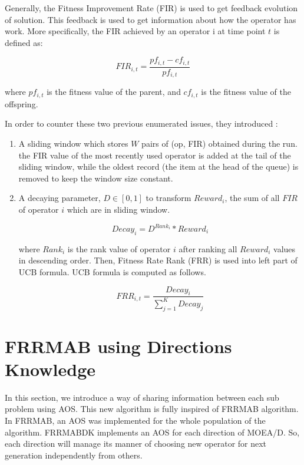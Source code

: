 \documentclass{article}
\begin{document}
    Generally, the Fitness Improvement Rate (FIR) is used to get feedback evolution of solution. This feedback is used to get information about how the operator has work. More specifically, the FIR achieved by an operator i at time point $t$ is defined as:

    \begin{equation} \label{eq:FIR} \tag{FIR}
    FIR_{i,t} = \frac{pf_{i,t} - cf_{i,t}}{pf_{i,t}}
    \end{equation}

    where $pf_{i,t}$  is the fitness value of the parent, and $cf_{i,t} $ is the
    fitness value of the offspring.

    \vspace{3mm}
    In order to counter these two previous enumerated issues, they introduced :


    \begin{enumerate}[label=(\Alph*)]
        \item A sliding window which stores $W$ pairs of (op, FIR) obtained during the run. the FIR value of the most recently used operator is added at the tail of the sliding window, while the oldest record (the item at the head of the queue) is removed to keep the window size constant.
        \item A decaying parameter, $D \in [0, 1]$ to transform $Reward_i$, the sum of all $FIR$ of operator $i$ which are in sliding window.

        \begin{equation} \label{eq:Decay} \tag{Decay factor}
        Decay_i = D^{Rank_i} * Reward_i
        \end{equation}

        where $Rank_i$ is the rank value of operator $i$ after ranking all $Reward_i$ values in descending order. Then, Fitness Rate Rank (FRR) is used into left part of UCB formula. UCB formula is computed as follows.

        \begin{equation} \label{eq:FIR} \tag{FIR}
        FRR_{i,t} = \frac{Decay_i}{\sum\limits_{j=1}^K Decay_j}
        \end{equation}
    \end{enumerate}


    \section{FRRMAB using Directions Knowledge}

    In this section, we introduce a way of sharing information between each sub problem using AOS. This new algorithm is fully inspired of FRRMAB algorithm. In FRRMAB, an AOS was implemented for the whole population of the algorithm. FRRMABDK implements an AOS for each direction of MOEA/D. So, each direction will manage its manner of choosing new operator for next generation independently from others.
\end{document}
